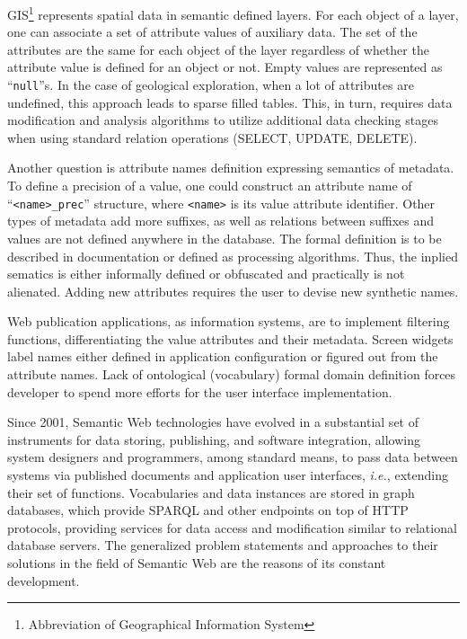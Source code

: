\documentclass[
]{ceurart}
\begin{document}
GIS\footnote{Abbreviation of Geographical Information System} represents spatial data in semantic defined layers.  For each object of a layer, one can associate a set of attribute values of auxiliary data.  The set of the attributes are the same for each object of the layer regardless of whether the attribute value is defined for an object or not.  Empty values are represented as ``\texttt{null}''s.  In the case of geological exploration, when a lot of attributes are undefined, this approach leads to sparse filled tables.  This, in turn, requires data modification and analysis algorithms to utilize additional data checking stages when using standard relation operations (SELECT, UPDATE, DELETE).

Another question is attribute names definition expressing semantics of metadata.  To define a precision of a value, one could construct an attribute name of ``\texttt{<name>\_prec}'' structure, where \texttt{<name>} is its value attribute identifier.  Other types of metadata add more suffixes, as well as relations between suffixes and values are not defined anywhere in the database.  The formal definition is to be described in documentation or defined as processing algorithms.  Thus, the inplied sematics is either informally defined or obfuscated and practically is not alienated.  Adding new attributes requires the user to devise new synthetic names.

Web publication applications, as information systems, are to implement filtering functions, differentiating the value attributes and their metadata.  Screen widgets label names either defined in application configuration or figured out from the attribute names.  Lack of ontological (vocabulary) formal domain definition forces developer to spend more efforts for the user interface implementation.

Since 2001, Semantic Web technologies have evolved in a substantial set of instruments for data storing, publishing, and software integration, allowing system designers and programmers, among standard means, to pass data between systems via published documents and application user interfaces, \emph{i.e.}, extending their set of functions.  Vocabularies and data instances are stored in graph databases, which provide SPARQL and other endpoints on top of HTTP protocols, providing services for data access and modification similar to relational database servers.  The generalized problem statements and approaches to their solutions in the field of Semantic Web are the reasons of its constant development.
\end{document}
